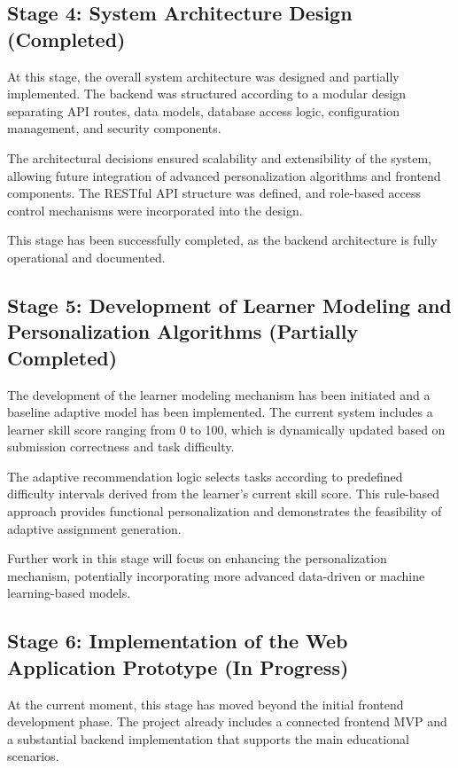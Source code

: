 \documentclass[a4paper,12pt]{extarticle}
\begin{document}
\subsection*{Stage 4: System Architecture Design (Completed)}

At this stage, the overall system architecture was designed and partially implemented. The backend was structured according to a modular design separating API routes, data models, database access logic, configuration management, and security components. 

The architectural decisions ensured scalability and extensibility of the system, allowing future integration of advanced personalization algorithms and frontend components. The RESTful API structure was defined, and role-based access control mechanisms were incorporated into the design.

This stage has been successfully completed, as the backend architecture is fully operational and documented.

\subsection*{Stage 5: Development of Learner Modeling and Personalization Algorithms (Partially Completed)}

The development of the learner modeling mechanism has been initiated and a baseline adaptive model has been implemented. The current system includes a learner skill score ranging from 0 to 100, which is dynamically updated based on submission correctness and task difficulty.

The adaptive recommendation logic selects tasks according to predefined difficulty intervals derived from the learner’s current skill score. This rule-based approach provides functional personalization and demonstrates the feasibility of adaptive assignment generation.

Further work in this stage will focus on enhancing the personalization mechanism, potentially incorporating more advanced data-driven or machine learning-based models.

\subsection*{Stage 6: Implementation of the Web Application Prototype (In Progress)}

At the current moment, this stage has moved beyond the initial frontend development phase. The project already includes a connected frontend MVP and a substantial backend implementation that supports the main educational scenarios.
\end{document}
